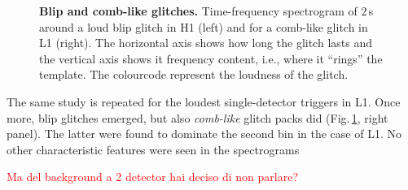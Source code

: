 \documentclass[binding=0.6cm, LaM]{sapthesis}
\newcommand{\fpg}[1]{\textcolor{red}{#1} }
\begin{document}
        \begin{figure}[t]
          \noindent
          \label{glitch}
          \centering
          \caption{{\bf Blip and comb-like glitches.} Time-frequency spectrogram of $2\,$s around a loud blip glitch in H1 (left) and for a comb-like glitch in L1 (right).  The horizontal axis shows how long the glitch lasts and the vertical axis shows it frequency content, i.e., where it ``rings'' the template.  The colourcode represent the loudness of the glitch.}
          \label{fig:glitches}
        \end{figure}

	The same study is repeated for the loudest single-detector triggers in L1.
	Once more, blip glitches emerged, but also {\it comb-like} glitch packs did (Fig.\,\ref{fig:glitches}, right panel).
        The latter were found to dominate the second bin in the case of L1.
	No other characteristic features were seen in the spectrograms

        \fpg{Ma del background a 2 detector hai deciso di non parlare?}
\end{document}
